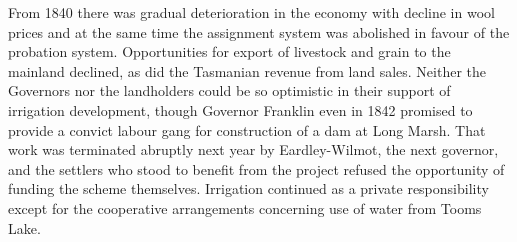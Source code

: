 From 1840 there was gradual deterioration in the economy with decline
in wool prices and at the same time the assignment system was
abolished in favour of the probation system.  Opportunities for export
of livestock and grain to the mainland declined, as did the Tasmanian
revenue from land sales.  Neither the Governors nor the landholders
could be so optimistic in their support of irrigation development,
though Governor Franklin even in 1842 promised to provide a convict
labour gang for construction of a dam at Long Marsh.  That work was
terminated abruptly next year by Eardley-Wilmot, the next governor,
and the settlers who stood to benefit from the project refused the
opportunity of funding the scheme themselves.  Irrigation continued as
a private responsibility except for the cooperative arrangements
concerning use of water from Tooms Lake.

